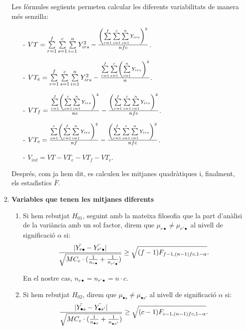 \begin{enumerate}
Les f\'ormules seg\"uents permeten calcular les diferents variabilitats de manera m\'es
senzilla:

\begin{itemize}
\item[-] $VT = \sum\limits_{r=1}^f \sum\limits_{s=1}^c \sum\limits_{i=1}^n Y_{irs}^2
- {\left( \sum\limits_{r=1}^f \sum\limits_{s=1}^c \sum\limits_{i=1}^n Y_{irs}
\right)^2 \over n f c}$.

\item[-] $VT_e = \sum\limits_{r=1}^f \sum\limits_{s=1}^c \sum\limits_{i=1}^n
Y_{irs}^2 - {\sum\limits_{r=1}^f \sum\limits_{s=1}^c \left( \sum\limits_{i=1}^n
Y_{irs} \right)^2 \over n}$.

\item[-] $VT_f = {\sum\limits_{r=1}^f \left( \sum\limits_{s=1}^c \sum\limits_{i=1}^n
Y_{irs} \right)^2 \over n c} - {\left( \sum\limits_{r=1}^f \sum\limits_{s=1}^c
\sum\limits_{i=1}^n Y_{irs} \right)^2 \over n f c}$.

\item[-] $VT_c = {\sum\limits_{s=1}^c \left( \sum\limits_{r=1}^f \sum\limits_{i=1}^n
Y_{irs} \right)^2 \over n f} - {\left( \sum\limits_{r=1}^f \sum\limits_{s=1}^c
\sum\limits_{i=1}^n Y_{irs} \right)^2 \over n f c}$.

\item[-] $ V_{int} = VT - VT_e - VT_f - VT_c$.
\end{itemize}

Despr\'es, com ja hem dit, es calculen les mitjanes quadr\`atiques i, finalment, els
estad\'{\i}stics $\bar{F}$.

\item {\bf Variables que tenen les mitjanes diferents}

\begin{enumerate}
\item Si hem rebutjat $H_{01}$, seguint amb la mateixa filosofia que la part
d'an\`alisi de la vari\`ancia amb un sol factor, direm que $\mu_{r\bullet} \not = 
\mu_{r'\bullet}$
al nivell de significaci\'o $\alpha$ si:
$${|\bar{Y_{r\bullet}} - \bar{Y_{r'\bullet}}| \over \sqrt{MC_e \cdot ({1 \over 
n_{r\bullet}} + {1
\over n_{r'\bullet}})}} \geq \sqrt{(f-1) F_{f-1,(n-1) f c,1-\alpha}}.$$

En el nostre cas, $n_{r\bullet} = n_{r'\bullet} = n \cdot c$.

\item Si hem rebutjat $H_{02}$, direm que $\mu_{\bullet s} \not = \mu_{\bullet s'}$ al nivell
de significaci\'o $\alpha$ si:
$${|\bar{Y_{\bullet s}} - \bar{Y_{\bullet s'}}| \over \sqrt{MC_e \cdot ({1 
\over n_{\bullet s}} + {1
\over n_{\bullet s'}})}} \geq \sqrt{(c-1) F_{c-1,(n-1) f c,1-\alpha}}.$$


\end{enumerate}
\end{enumerate}
